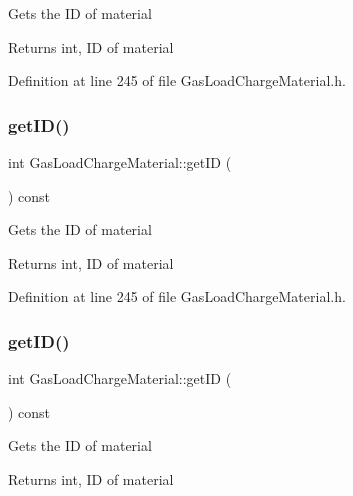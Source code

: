 Gets the ID of material \begin{DoxyReturn}{Returns}
int, ID of material 
\end{DoxyReturn}


Definition at line 245 of file Gas\+Load\+Charge\+Material.\+h.

\mbox{\label{class_gas_load_charge_material_ab3e425ad095a593b7e9e365606759d9d}} 
\subsubsection{\texorpdfstring{get\+I\+D()}{getID()}\hspace{0.1cm}{\footnotesize\ttfamily [2/3]}}
{\footnotesize\ttfamily int Gas\+Load\+Charge\+Material\+::get\+ID (\begin{DoxyParamCaption}{ }\end{DoxyParamCaption}) const\hspace{0.3cm}{\ttfamily [inline]}}

Gets the ID of material \begin{DoxyReturn}{Returns}
int, ID of material 
\end{DoxyReturn}


Definition at line 245 of file Gas\+Load\+Charge\+Material.\+h.

\mbox{\label{class_gas_load_charge_material_ab3e425ad095a593b7e9e365606759d9d}} 
\subsubsection{\texorpdfstring{get\+I\+D()}{getID()}\hspace{0.1cm}{\footnotesize\ttfamily [3/3]}}
{\footnotesize\ttfamily int Gas\+Load\+Charge\+Material\+::get\+ID (\begin{DoxyParamCaption}{ }\end{DoxyParamCaption}) const\hspace{0.3cm}{\ttfamily [inline]}}

Gets the ID of material \begin{DoxyReturn}{Returns}
int, ID of material 
\end{DoxyReturn}


